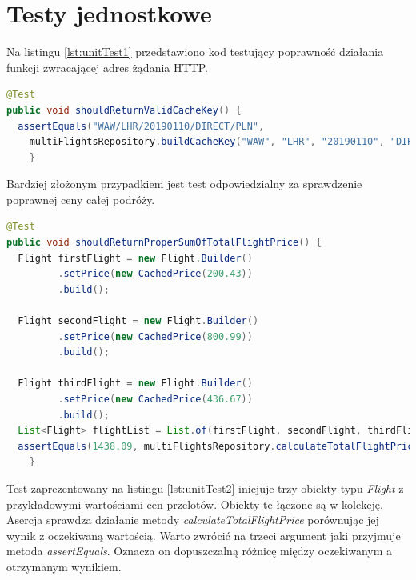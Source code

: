 \documentclass[12pt, twoside]{report}
\begin{document}
\section{Testy jednostkowe}
Na listingu \ref{lst:unitTest1} przedstawiono kod testujący poprawność działania funkcji zwracającej adres żądania HTTP.
\begin{lstlisting}[language=java, caption=Przykładowy test jednostkowy, label=lst:unitTest1]
@Test
public void shouldReturnValidCacheKey() {
  assertEquals("WAW/LHR/20190110/DIRECT/PLN",
    multiFlightsRepository.buildCacheKey("WAW", "LHR", "20190110", "DIRECT", "PLN"));
    }
\end{lstlisting}
Bardziej złożonym przypadkiem jest test odpowiedzialny za sprawdzenie poprawnej ceny całej podróży.
\begin{lstlisting}[language=java, caption=Przykładowy test jednostkowy, label=lst:unitTest2]
@Test
public void shouldReturnProperSumOfTotalFlightPrice() {
  Flight firstFlight = new Flight.Builder()
         .setPrice(new CachedPrice(200.43))
         .build();
 
  Flight secondFlight = new Flight.Builder()
         .setPrice(new CachedPrice(800.99))
         .build();

  Flight thirdFlight = new Flight.Builder()
         .setPrice(new CachedPrice(436.67))
         .build();
  List<Flight> flightList = List.of(firstFlight, secondFlight, thirdFlight);
  assertEquals(1438.09, multiFlightsRepository.calculateTotalFlightPrice(flightList), 0.001);
    }
\end{lstlisting}

Test zaprezentowany na listingu \ref{lst:unitTest2} inicjuje trzy obiekty typu \textit{Flight} z przykładowymi wartościami cen przelotów. Obiekty te łączone są w kolekcję. Asercja sprawdza działanie metody \textit{calculateTotalFlightPrice} porównując jej wynik z oczekiwaną wartością. Warto zwrócić na trzeci argument jaki przyjmuje metoda \textit{assertEquals}. Oznacza on dopuszczalną różnicę między oczekiwanym a otrzymanym wynikiem.
\end{document}
